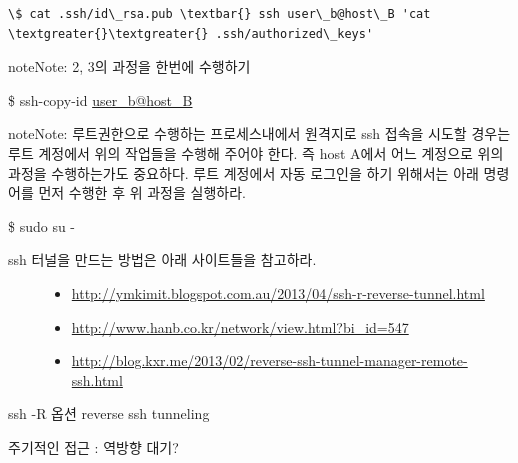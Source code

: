 \documentclass[letterpaper,10pt,english]{sphinxmanual}
\begin{document}
\begin{Verbatim}[commandchars=\\\{\}]
\$ cat .ssh/id\_rsa.pub \textbar{} ssh user\_b@host\_B 'cat \textgreater{}\textgreater{} .ssh/authorized\_keys'
\end{Verbatim}

\begin{notice}{note}{Note:}
2, 3의 과정을 한번에 수행하기

\$ ssh-copy-id \href{mailto:user\_b@host\_B}{user\_b@host\_B}
\end{notice}

\begin{notice}{note}{Note:}
루트권한으로 수행하는 프로세스내에서 원격지로 ssh 접속을 시도할 경우는
루트 계정에서 위의 작업들을 수행해 주어야 한다. 즉 host A에서 어느 계정으로
위의 과정을 수행하는가도 중요하다. 루트 계정에서 자동 로그인을 하기 위해서는
아래 명령어를 먼저 수행한 후 위 과정을 실행하라.

\$ sudo su -
\end{notice}
\begin{description}
\item[{ssh 터널을 만드는 방법은 아래 사이트들을 참고하라.}] \leavevmode\begin{itemize}
\item {} 
\href{http://ymkimit.blogspot.com.au/2013/04/ssh-r-reverse-tunnel.html}{http://ymkimit.blogspot.com.au/2013/04/ssh-r-reverse-tunnel.html}

\item {} 
\href{http://www.hanb.co.kr/network/view.html?bi\_id=547}{http://www.hanb.co.kr/network/view.html?bi\_id=547}

\item {} 
\href{http://blog.kxr.me/2013/02/reverse-ssh-tunnel-manager-remote-ssh.html}{http://blog.kxr.me/2013/02/reverse-ssh-tunnel-manager-remote-ssh.html}

\end{itemize}

\end{description}

ssh -R 옵션
reverse ssh tunneling

주기적인 접근 : 역방향 대기?



\renewcommand{\indexname}{Index}
\printindex
\end{document}
